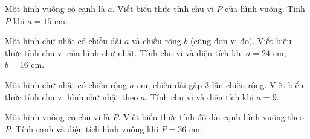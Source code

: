 

\begin{bt}%
	Một hình vuông có cạnh là $a$. Viết biểu thức tính chu vi $P$ của hình vuông. Tính $P$ khi $a = 15$ cm.
\end{bt}

\begin{bt}%
	Một hình chữ nhật có chiều dài $a$ và chiều rộng $b$ (cùng đơn vị đo). Viết biểu thức tính chu vi của hình chữ nhật. Tính chu vi và diện tích khi $a = 24$ cm, $b = 16$ cm.
\end{bt}

\begin{bt}%
	Một hình chữ nhật có chiều rộng $a$ cm, chiều dài gấp $3$ lần chiều rộng. Viết biểu thức tính chu vi hình chữ nhật theo $a$. Tính chu vi và diện tích khi $a = 9$.
\end{bt}

\begin{bt}%
	Một hình vuông có chu vi là $P$. Viết biểu thức tính độ dài cạnh hình vuông theo $P$. Tính cạnh và diện tích hình vuông khi $P = 36$ cm.
\end{bt}
